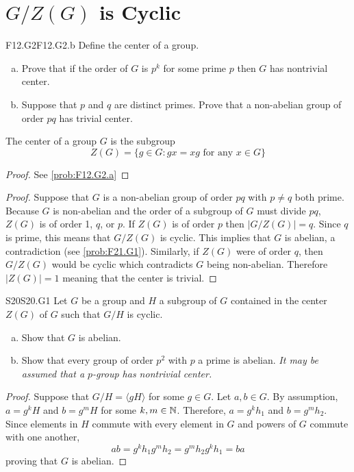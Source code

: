 \documentclass[../AlgebraQualSolutions.tex]{subfiles}
\begin{document}
\section{$G/Z(G)$ is Cyclic}

	\begin{prob}{F12.G2}{F12.G2.b}
	Define the center of a group.
	\begin{enumerate}[(a)]
	\item Prove that if the order of $G$ is $p^k$ for some prime $p$ then $G$ has nontrivial center.
	\item Suppose that $p$ and $q$ are distinct primes. Prove that a non-abelian group of order $pq$ has trivial center.
	\end{enumerate}
	\end{prob}
	
	The center of a group $G$ is the subgroup
		\[Z(G) = \{g \in G: gx = xg \textrm{ for any $x \in G$} \} \]
	
	\begin{proof}
		See \ref{prob:F12.G2.a}
	\end{proof}

	\begin{proof}
		Suppose that $G$ is a non-abelian group of order $pq$ with $p \neq q$ both prime. Because $G$ is non-abelian and the order of a subgroup of $G$ must divide $pq$, $Z(G)$ is of order 1, $q$, or $p$. If $Z(G)$ is of order $p$ then $|G/Z(G)| = q$. Since $q$ is prime, this means that $G/Z(G)$ is cyclic. This implies that $G$ is abelian, a contradiction (see \ref{prob:F21.G1}). Similarly, if $Z(G)$ were of order $q$, then $G/Z(G)$ would be cyclic which contradicts $G$ being non-abelian. Therefore $|Z(G)| = 1$ meaning that the center is trivial.
	\end{proof}

	\begin{prob}{S20}{S20.G1}
	Let $G$ be a group and $H$ a subgroup of $G$ contained in the center $Z(G)$ of $G$ such that $G/H$ is cyclic.
	\begin{enumerate}[(a)]
	\item Show that $G$ is abelian.
	\item Show that every group of order $p^2$ with $p$ a prime is abelian. \emph{It may be assumed that a $p$-group has nontrivial center.}
	\end{enumerate}
	\end{prob}
	
	\begin{proof}
	Suppose that $G/H = \langle gH \rangle$ for some $g \in G$. Let $a, b \in G$. By assumption, $a = g^kH$ and $b = g^mH$ for some $k,m \in \mathbb{N}$. Therefore, $a = g^kh_1$ and $b= g^m h_2$. Since elements in $H$ commute with every element in $G$ and powers of $G$ commute with one another,
		\[ab = g^kh_1g^mh_2 = g^mh_2g^k h_1 = ba \]
	proving that $G$ is abelian.
	\end{proof}
	
\end{document}
